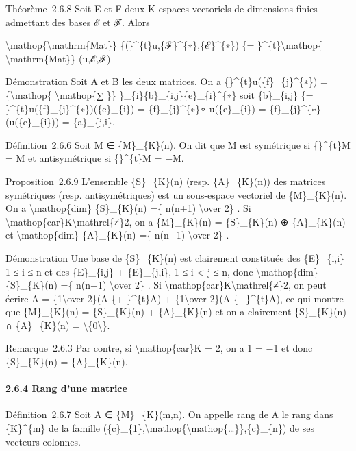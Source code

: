 \documentclass[]{article}
\begin{document}
Théorème~2.6.8 Soit E et F deux K-espaces vectoriels de dimensions
finies admettant des bases ℰ et ℱ. Alors

\textbackslash{}mathop\{\textbackslash{}mathrm\{Mat\}\}
\{(\}\^{}\{t\}u,\{ℱ\}\^{}\{∗\},\{ℰ\}\^{}\{∗\}) \{=
\}\^{}\{t\}\textbackslash{}mathop\{ \textbackslash{}mathrm\{Mat\}\}
(u,ℰ,ℱ)

Démonstration Soit A et B les deux matrices. On a
\{\}\^{}\{t\}u(\{f\}\_\{j\}\^{}\{∗\}) =\{\textbackslash{}mathop\{
\textbackslash{}mathop\{∑ \}\}
\}\_\{i\}\{b\}\_\{i,j\}\{e\}\_\{i\}\^{}\{∗\} soit \{b\}\_\{i,j\} \{=
\}\^{}\{t\}u(\{f\}\_\{j\}\^{}\{∗\})(\{e\}\_\{i\}) =
\{f\}\_\{j\}\^{}\{∗\}∘ u(\{e\}\_\{i\}) =
\{f\}\_\{j\}\^{}\{∗\}(u(\{e\}\_\{i\})) = \{a\}\_\{j,i\}.

Définition~2.6.6 Soit M ∈ \{M\}\_\{K\}(n). On dit que M est symétrique
si \{\}\^{}\{t\}M = M et antisymétrique si \{\}\^{}\{t\}M = −M.

Proposition~2.6.9 L'ensemble \{S\}\_\{K\}(n) (resp. \{A\}\_\{K\}(n)) des
matrices symétriques (resp. antisymétriques) est un sous-espace
vectoriel de \{M\}\_\{K\}(n). On a \textbackslash{}mathop\{dim\}
\{S\}\_\{K\}(n) =\{ n(n+1) \textbackslash{}over 2\} . Si
\textbackslash{}mathop\{car\}K\textbackslash{}mathrel\{≠\}2, on a
\{M\}\_\{K\}(n) = \{S\}\_\{K\}(n) ⊕ \{A\}\_\{K\}(n) et
\textbackslash{}mathop\{dim\} \{A\}\_\{K\}(n) =\{ n(n−1)
\textbackslash{}over 2\} .

Démonstration Une base de \{S\}\_\{K\}(n) est clairement constituée des
\{E\}\_\{i,i\} 1 ≤ i ≤ n et des \{E\}\_\{i,j\} + \{E\}\_\{j,i\}, 1 ≤ i
\textless{} j ≤ n, donc \textbackslash{}mathop\{dim\} \{S\}\_\{K\}(n)
=\{ n(n+1) \textbackslash{}over 2\} . Si
\textbackslash{}mathop\{car\}K\textbackslash{}mathrel\{≠\}2, on peut
écrire A = \{1\textbackslash{}over 2\}(A \{+ \}\^{}\{t\}A) +
\{1\textbackslash{}over 2\}(A \{−\}\^{}\{t\}A), ce qui montre que
\{M\}\_\{K\}(n) = \{S\}\_\{K\}(n) + \{A\}\_\{K\}(n) et on a clairement
\{S\}\_\{K\}(n) ∩ \{A\}\_\{K\}(n) =
\textbackslash{}\{0\textbackslash{}\}.

Remarque~2.6.3 Par contre, si \textbackslash{}mathop\{car\}K = 2, on a 1
= −1 et donc \{S\}\_\{K\}(n) = \{A\}\_\{K\}(n).

\paragraph{2.6.4 Rang d'une matrice}

Définition~2.6.7 Soit A ∈ \{M\}\_\{K\}(m,n). On appelle rang de A le
rang dans \{K\}\^{}\{m\} de la famille
(\{c\}\_\{1\},\textbackslash{}mathop\{\textbackslash{}mathop\{\ldots{}\}\},\{c\}\_\{n\})
de ses vecteurs colonnes.
\end{document}
